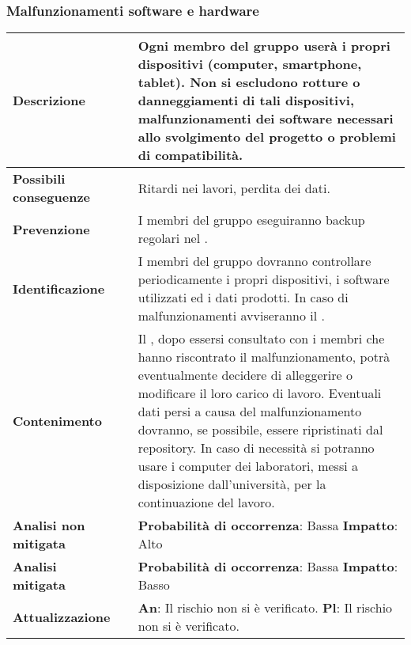 		\subsubsection {Malfunzionamenti software e hardware}
			\label{subsec:malfunzionamenttiSwHw}
			\small
			\begin{table}[H]
			\begin{center}			
			\begin{tabular}{p{2.5cm}p{0.5cm}p{11cm}}
			\arrayrulecolor{lightgray}
			
			\toprule				
				\textbf{Descrizione}
				& &
				Ogni membro del gruppo userà i propri dispositivi (computer, smartphone, tablet).
				Non si escludono rotture o danneggiamenti di tali dispositivi, malfunzionamenti dei software necessari allo svolgimento del progetto o problemi di compatibilità.
			\\
			\midrule
				\textbf{Possibili \newline conseguenze}
				& &
				Ritardi nei lavori, perdita dei dati.
			\\
			\midrule
				\textbf{Prevenzione}
				& &
	 			I membri del gruppo eseguiranno backup regolari nel \glo{Repository}{repository}.
	 		\\
			\midrule
				\textbf{Identificazione}
				& &
				I membri del gruppo dovranno controllare periodicamente i propri dispositivi, i software utilizzati ed i dati prodotti. In caso di malfunzionamenti avviseranno il \responsabilediprogetto.
			\\
			\midrule
				\textbf{Contenimento}
				& &
				Il \responsabilediprogetto, dopo essersi consultato con i membri che hanno riscontrato il malfunzionamento, potrà eventualmente decidere di alleggerire o modificare il loro carico di lavoro. Eventuali dati persi a causa del malfunzionamento dovranno, se possibile, essere ripristinati dal repository. In caso di necessità si potranno usare i computer dei laboratori, messi a disposizione dall'università, per la continuazione del lavoro.
			\\
			\midrule
				\textbf{Analisi \newline non mitigata}
				& &
				\textbf{Probabilità di occorrenza}: Bassa
				\newline
				\textbf{Impatto}: Alto
			\\
			\midrule
				\textbf{Analisi \newline mitigata}
				& &
				\textbf{Probabilità di occorrenza}: Bassa
				\newline
				\textbf{Impatto}: Basso
			\\
			\midrule
				\textbf{Attualizzazione}
				& &
				\textbf{An}: Il rischio non si è verificato.
				\newline
				\textbf{Pl}: Il rischio non si è verificato.
			\\
			
			\bottomrule	
			\end{tabular}
			\end{center}
			\end{table}			
			
